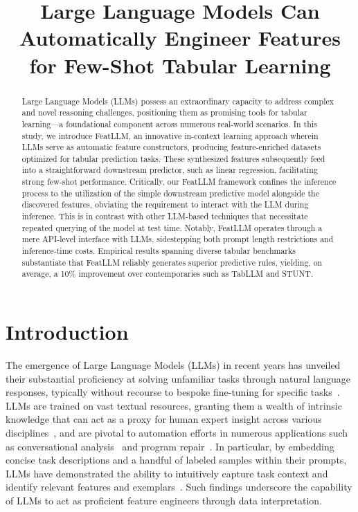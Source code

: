 \title{Large Language Models Can Automatically Engineer Features for Few-Shot Tabular Learning}

\begin{abstract}
Large Language Models (LLMs) possess an extraordinary capacity to address complex and novel reasoning challenges, positioning them as promising tools for tabular learning—a foundational component across numerous real-world scenarios. In this study, we introduce \textsf{FeatLLM}, an innovative in-context learning approach wherein LLMs serve as automatic feature constructors, producing feature-enriched datasets optimized for tabular prediction tasks. These synthesized features subsequently feed into a straightforward downstream predictor, such as linear regression, facilitating strong few-shot performance. Critically, our \textsf{FeatLLM} framework confines the inference process to the utilization of the simple downstream predictive model alongside the discovered features, obviating the requirement to interact with the LLM during inference. This is in contrast with other LLM-based techniques that necessitate repeated querying of the model at test time. Notably, \textsf{FeatLLM} operates through a mere API-level interface with LLMs, sidestepping both prompt length restrictions and inference-time costs. Empirical results spanning diverse tabular benchmarks substantiate that \textsf{FeatLLM} reliably generates superior predictive rules, yielding, on average, a 10\% improvement over contemporaries such as TabLLM and STUNT.
\end{abstract}

\section{Introduction}
The emergence of Large Language Models (LLMs) in recent years has unveiled their substantial proficiency at solving unfamiliar tasks through natural language responses, typically without recourse to bespoke fine-tuning for specific tasks~\cite{creswell2022selection,imani2023mathprompter,taylor2022galactica}. LLMs are trained on vast textual resources, granting them a wealth of intrinsic knowledge that can act as a proxy for human expert insight across various disciplines~\cite{Genomes2021,singhal2023large,wilcox2003role}, and are pivotal to automation efforts in numerous applications such as conversational analysis~\cite{finch2023leveraging} and program repair~\cite{fan2023automated}. In particular, by embedding concise task descriptions and a handful of labeled samples within their prompts, LLMs have demonstrated the ability to intuitively capture task context and identify relevant features and exemplars~\cite{brown2020language,zhao2023survey}. Such findings underscore the capability of LLMs to act as proficient feature engineers through data interpretation.

